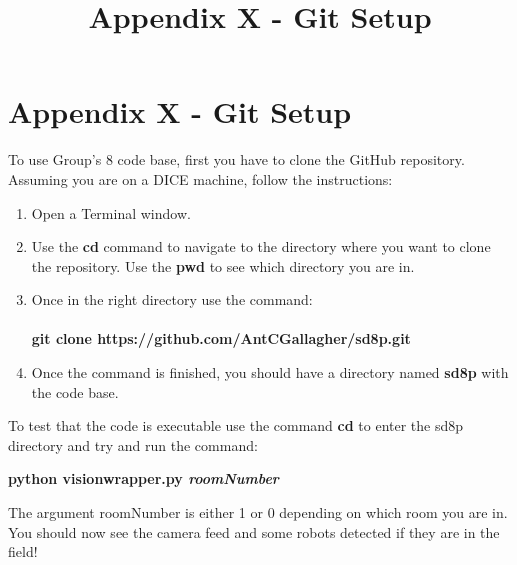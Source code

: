 \documentclass[a4paper,11pt]{article}
\begin{document}
\title{Appendix X -  Git Setup}
\maketitle

\newpage
\section*{Appendix X - Git Setup}
To use Group's 8 code base, first you have to clone the GitHub repository. Assuming you are on a DICE machine, follow the instructions:

\begin{enumerate}
  \item Open a Terminal window.
  \item Use the \textbf{cd} command to navigate to the directory where you want to clone the repository. Use the \textbf{pwd} to see which directory you are in.
  \item Once in the right directory use the command: \\ \\ \textbf{git clone https://github.com/AntCGallagher/sd8p.git}
  \item Once the command is finished, you should have a directory named \textbf{sd8p} with the code base.
\end{enumerate}

To test that the code is executable use the command \textbf{cd} to enter the sd8p directory and try and run the command: \\
\begin{center}
\textbf{python visionwrapper.py \textit{roomNumber}} 
\end{center}

The argument roomNumber is either 1 or 0 depending on which room you are in. You should now see the camera feed and some robots detected if they are in the field!
\end{document}
